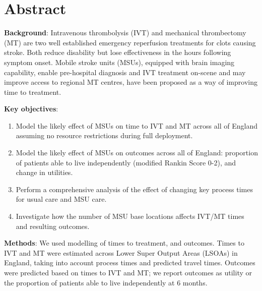 \section*{Abstract}

\textbf{Background}: Intravenous thrombolysis (IVT) and mechanical thrombectomy (MT) are two well established emergency reperfusion treatments for clots causing stroke. Both reduce disability but lose effectiveness in the hours following symptom onset. Mobile stroke units (MSUs), equipped with brain imaging capability, enable pre-hospital diagnosis and IVT treatment on-scene and may improve access to regional MT centres, have been proposed as a way of improving time to treatment.

\textbf{Key objectives}:

\begin{enumerate}
    \item Model the likely effect of MSUs on time to IVT and MT across all of England assuming no resource restrictions during full deployment.
    \item Model the likely effect of MSUs on outcomes across all of England: proportion of patients able to live independently (modified Rankin Score 0-2), and change in utilities.
    \item Perform a comprehensive analysis of the effect of changing key process times for usual care and MSU care.
    \item Investigate how the number of MSU base locations affects IVT/MT times and resulting outcomes.
\end{enumerate}

\textbf{Methods}: We used modelling of times to treatment, and outcomes. Times to IVT and MT were estimated across Lower Super Output Areas (LSOAs) in England, taking into account process times and predicted travel times. Outcomes were predicted based on times to IVT and MT; we report outcomes as utility or the proportion of patients able to live independently at 6 months.


